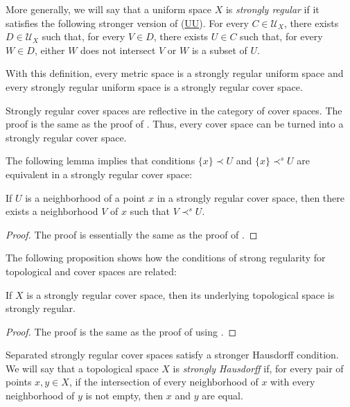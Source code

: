 \documentclass[reqno]{amsart}
\newcommand{\axref}[1]{(\hyperref[ax:#1]{#1})}
\theoremstyle{definition}
\theoremstyle{remark}
\numberwithin{figure}{section}
\newcommand{\rb}{\prec}
\begin{document}
\begin{example}
More generally, we will say that a uniform space $X$ is \emph{strongly regular} if it satisfies the following stronger version of \axref{UU}.
For every $C \in \mathcal{U}_X$, there exists $D \in \mathcal{U}_X$ such that, for every $V \in D$,
there exists $U \in C$ such that, for every $W \in D$, either $W$ does not intersect $V$ or $W$ is a subset of $U$.

With this definition, every metric space is a strongly regular uniform space and every strongly regular uniform space is a strongly regular cover space.
\end{example}

\begin{example}
Strongly regular cover spaces are reflective in the category of cover spaces.
The proof is the same as the proof of .
Thus, every cover space can be turned into a strongly regular cover space.
\end{example}

The following lemma implies that conditions $\{ x \} \rb U$ and $\{ x \} \rb^s U$ are equivalent in a strongly regular cover space:

\begin{lem}
If $U$ is a neighborhood of a point $x$ in a strongly regular cover space, then there exists a neighborhood $V$ of $x$ such that $V \rb^s U$.
\end{lem}
\begin{proof}
The proof is essentially the same as the proof of .
\end{proof}

The following proposition shows how the conditions of strong regularity for topological and cover spaces are related:

\begin{prop}
If $X$ is a strongly regular cover space, then its underlying topological space is strongly regular.
\end{prop}
\begin{proof}
The proof is the same as the proof of  using .
\end{proof}

Separated strongly regular cover spaces satisfy a stronger Hausdorff condition.
We will say that a topological space $X$ is \emph{strongly Hausdorff} if, for every pair of points $x,y \in X$, if the intersection of every neighborhood of $x$ with every neighborhood of $y$ is not empty, then $x$ and $y$ are equal.
\end{document}
